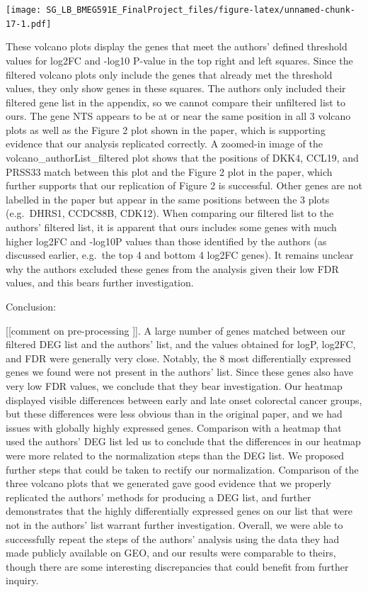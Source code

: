 \documentclass[
]{article}
\begin{document}
\texttt{[image: SG\_LB\_BMEG591E\_FinalProject\_files/figure-latex/unnamed-chunk-17-1.pdf]}

These volcano plots display the genes that meet the authors' defined
threshold values for \textbar log2FC\textbar{} and -log10 P-value in the
top right and left squares. Since the filtered volcano plots only
include the genes that already met the threshold values, they only show
genes in these squares. The authors only included their filtered gene
list in the appendix, so we cannot compare their unfiltered list to
ours. The gene NTS appears to be at or near the same position in all 3
volcano plots as well as the Figure 2 plot shown in the paper, which is
supporting evidence that our analysis replicated correctly. A zoomed-in
image of the volcano\_authorList\_filtered plot shows that the positions
of DKK4, CCL19, and PRSS33 match between this plot and the Figure 2 plot
in the paper, which further supports that our replication of Figure 2 is
successful. Other genes are not labelled in the paper but appear in the
same positions between the 3 plots (e.g.~DHRS1, CCDC88B, CDK12). When
comparing our filtered list to the authors' filtered list, it is
apparent that ours includes some genes with much higher
\textbar log2FC\textbar{} and -log10P values than those identified by
the authors (as discussed earlier, e.g.~the top 4 and bottom 4 log2FC
genes). It remains unclear why the authors excluded these genes from the
analysis given their low FDR values, and this bears further
investigation.

Conclusion:

{[}{[}comment on pre-processing {]}{]}. A large number of genes matched
between our filtered DEG list and the authors' list, and the values
obtained for logP, log2FC, and FDR were generally very close. Notably,
the 8 most differentially expressed genes we found were not present in
the authors' list. Since these genes also have very low FDR values, we
conclude that they bear investigation. Our heatmap displayed visible
differences between early and late onset colorectal cancer groups, but
these differences were less obvious than in the original paper, and we
had issues with globally highly expressed genes. Comparison with a
heatmap that used the authors' DEG list led us to conclude that the
differences in our heatmap were more related to the normalization steps
than the DEG list. We proposed further steps that could be taken to
rectify our normalization. Comparison of the three volcano plots that we
generated gave good evidence that we properly replicated the authors'
methods for producing a DEG list, and further demonstrates that the
highly differentially expressed genes on our list that were not in the
authors' list warrant further investigation. Overall, we were able to
successfully repeat the steps of the authors' analysis using the data
they had made publicly available on GEO, and our results were comparable
to theirs, though there are some interesting discrepancies that could
benefit from further inquiry.
\end{document}
